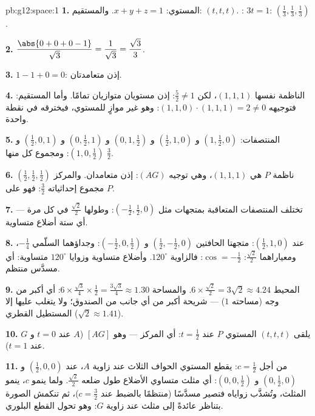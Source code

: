 \begin{solution}{pb:g12:space:1}
\textbf{1.} المستوي: $x + y + z = 1$. والمستقيم: $(t, t, t)$.
: $3t = 1$:
$\left(\frac13, \frac13, \frac13\right)$.

\textbf{2.} $\dfrac{\abs{0 + 0 + 0 - 1}}{\sqrt3} =
\dfrac{1}{\sqrt3} = \dfrac{\sqrt3}{3}$.

\textbf{3.} $1 - 1 + 0 = 0$: إذن متعامدتان.

\textbf{4.} الناظمة نفسها $(1,1,1)$، لكن $\frac52 \neq 1$:
إذن مستويان متوازيان تمامًا. وأما المستقيم: فتوجيهه
$(1,1,0) \cdot (1,1,1) = 2 \neq 0$: وهو غير موازٍ للمستوي،
فيخترقه في نقطة واحدة.

\textbf{5.} المنتصفات: $\left(1, \frac12, 0\right)$ و
$\left(\frac12, 1, 0\right)$ و $\left(0, 1, \frac12\right)$ و
$\left(0, \frac12, 1\right)$ و $\left(\frac12, 0, 1\right)$ و
$\left(1, 0, \frac12\right)$: ومجموع  كل منها
$\frac32$.

\textbf{6.} ناظمة $P$ هي $(1,1,1)$، وهي توجيه
$(AG)$: إذن متعامدان. والمركز
$\left(\frac12,\frac12,\frac12\right)$ مجموع إحداثياته
$\frac32$: فهو على $P$.

\textbf{7.} تختلف المنتصفات المتعاقبة بمتجهات مثل
$\left(-\frac12, \frac12, 0\right)$: وطولها
$\frac{\sqrt2}{2}$ في كل مرة --- أي ستة أضلاع متساوية.

\textbf{8.} عند $\left(\frac12, 1, 0\right)$: متجهتا الحافتين
$\left(\frac12, -\frac12, 0\right)$ و
$\left(-\frac12, 0, \frac12\right)$: وجداؤهما السلّمي $-\frac14$،
ومعياراهما $\frac{\sqrt2}{2}$: $\cos = -\frac12$: فالزاوية
$120^\circ$. وأضلاع متساوية وزوايا $120^\circ$ متساوية: أي مسدَّس
منتظم.

\textbf{9.} المحيط $6 \times \frac{\sqrt2}{2} = 3\sqrt2
\approx 4.24$. والمساحة $6 \times \frac{\sqrt3}{4} \times
\frac12 = \frac{3\sqrt3}{4} \approx 1.30$: أي أكبر من وجه
(مساحته $1$) --- شريحة أكبر من أي جانب من الصندوق؛ ولا
يتغلب عليها إلا المستطيل القطري ($\sqrt2 \approx 1.41$).

\textbf{10.} يلقى $(t,t,t)$ المستوي $P$ عند $t = \frac12$: أي المركز
--- وهو  $[AG]$ ($A$ عند $t = 0$ و $G$ عند
$t = 1$).

\textbf{11.} من أجل $c = \frac12$: يقطع المستوي الحواف الثلاث
عند زاوية $A$، عند $\left(\frac12,0,0\right)$ و
$\left(0,\frac12,0\right)$ و $\left(0,0,\frac12\right)$: أي
مثلث متساوي الأضلاع طول ضلعه $\frac{\sqrt2}{2}$. ولما ينمو $c$،
ينمو المثلث، وتُشذَّب زواياه فتصير مسدَّسًا
(منتظمًا بالضبط عند $c = \frac32$)، ثم تنكمش الصورة
بتناظر عائدةً إلى مثلث عند زاوية $G$: وهو
تحول القطع البلوري.


\end{solution}
